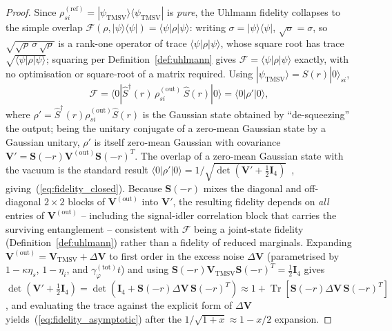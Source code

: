 \documentclass[journal]{IEEEtran}
\DeclareMathOperator{\Tr}{Tr}
\begin{document}
\begin{proof}
Since $\rho_{si}^{(\text{ref})}=|\psi_{\text{TMSV}}\rangle\langle\psi_{\text{TMSV}}|$ is \emph{pure}, the Uhlmann fidelity collapses to the simple overlap $\mathcal F(\rho,|\psi\rangle\langle\psi|)=\langle\psi|\rho|\psi\rangle$: writing $\sigma=|\psi\rangle\langle\psi|$, $\sqrt\sigma=\sigma$, so $\sqrt{\sqrt\rho\,\sigma\,\sqrt\rho}$ is a rank-one operator of trace $\langle\psi|\rho|\psi\rangle$, whose square root has trace $\sqrt{\langle\psi|\rho|\psi\rangle}$; squaring per Definition~\ref{def:uhlmann} gives $\mathcal F=\langle\psi|\rho|\psi\rangle$ exactly, with no optimisation or square-root of a matrix required. Using $|\psi_{\text{TMSV}}\rangle=\hat S(r)|0\rangle_{si}$,
\begin{equation}
\mathcal F = \langle 0|\hat S^\dagger(r)\,\rho_{si}^{(\text{out})}\,\hat S(r)|0\rangle = \langle 0|\rho'|0\rangle,
\end{equation}
where $\rho' = \hat S^\dagger(r)\rho_{si}^{(\text{out})}\hat S(r)$ is the Gaussian state obtained by ``de-squeezing'' the output; being the unitary conjugate of a zero-mean Gaussian state by a Gaussian unitary, $\rho'$ is itself zero-mean Gaussian with covariance $\mathbf V' = \mathbf S(-r)\mathbf V^{(\text{out})}\mathbf S(-r)^T$. The overlap of a zero-mean Gaussian state with the vacuum is the standard result $\langle 0|\rho'|0\rangle = 1/\sqrt{\det(\mathbf V'+\tfrac12\mathbf I_4)}$~\cite{weedbrook2012gaussian}, giving~(\ref{eq:fidelity_closed}). Because $\mathbf S(-r)$ mixes the diagonal and off-diagonal $2\times2$ blocks of $\mathbf V^{(\text{out})}$ into $\mathbf V'$, the resulting fidelity depends on \emph{all} entries of $\mathbf V^{(\text{out})}$ -- including the signal-idler correlation block that carries the surviving entanglement -- consistent with $\mathcal F$ being a joint-state fidelity (Definition~\ref{def:uhlmann}) rather than a fidelity of reduced marginals. Expanding $\mathbf V^{(\text{out})} = \mathbf V_{\text{TMSV}} + \Delta\mathbf V$ to first order in the excess noise $\Delta\mathbf V$ (parametrised by $1-\kappa\eta_s$, $1-\eta_i$, and $\gamma_\varphi^{(\text{tot})}t$) and using $\mathbf S(-r)\mathbf V_{\text{TMSV}}\mathbf S(-r)^T=\tfrac12\mathbf I_4$ gives $\det(\mathbf V'+\tfrac12\mathbf I_4)=\det(\mathbf I_4+\mathbf S(-r)\Delta\mathbf V\,\mathbf S(-r)^T)\approx 1+\Tr[\mathbf S(-r)\Delta\mathbf V\,\mathbf S(-r)^T]$, and evaluating the trace against the explicit form of $\Delta \mathbf V$ yields~(\ref{eq:fidelity_asymptotic}) after the $1/\sqrt{1+x}\approx 1-x/2$ expansion.
\end{proof}
\end{document}
